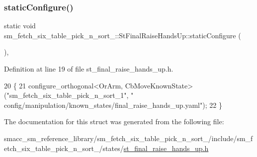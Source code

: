 \subsubsection{\texorpdfstring{static\+Configure()}{staticConfigure()}}
{\footnotesize\ttfamily static void sm\+\_\+fetch\+\_\+six\+\_\+table\+\_\+pick\+\_\+n\+\_\+sort\+\_\+::\+St\+Final\+Raise\+Hands\+Up\+::static\+Configure (\begin{DoxyParamCaption}{ }\end{DoxyParamCaption})\hspace{0.3cm}{\ttfamily [inline]}, {\ttfamily [static]}}



Definition at line 19 of file st\+\_\+final\+\_\+raise\+\_\+hands\+\_\+up.\+h.


\begin{DoxyCode}
20     \{
21         configure\_orthogonal<OrArm, CbMoveKnownState>(\textcolor{stringliteral}{"sm\_fetch\_six\_table\_pick\_n\_sort\_1"}, \textcolor{stringliteral}{"
      config/manipulation/known\_states/final\_raise\_hands\_up.yaml"});
22     \}
\end{DoxyCode}


The documentation for this struct was generated from the following file\+:\begin{DoxyCompactItemize}
\item 
smacc\+\_\+sm\+\_\+reference\+\_\+library/sm\+\_\+fetch\+\_\+six\+\_\+table\+\_\+pick\+\_\+n\+\_\+sort\+\_/include/sm\+\_\+fetch\+\_\+six\+\_\+table\+\_\+pick\+\_\+n\+\_\+sort\+\_/states/\hyperlink{st__final__raise__hands__up_8h}{st\+\_\+final\+\_\+raise\+\_\+hands\+\_\+up.\+h}\end{DoxyCompactItemize}
